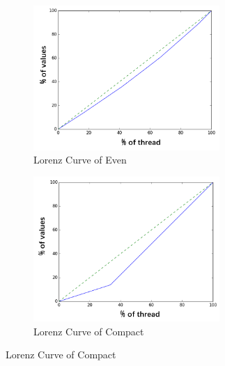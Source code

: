\begin{figure}[!htp]
  \centering
  \begin{subfigure}{8.0cm}
    \centering
    \includegraphics[height=5.5cm]{figure/even-varying.png}
    \caption{Lorenz Curve of Even}
  \end{subfigure}
  \hspace{1em}
  \begin{subfigure}{6.0cm}
    \centering
    \includegraphics[height=5.5cm]{figure/compact-varying.png}
    \caption{Lorenz Curve of Compact}
  \end{subfigure}
  \label{fig:compact-even-varying}
\end{figure}


